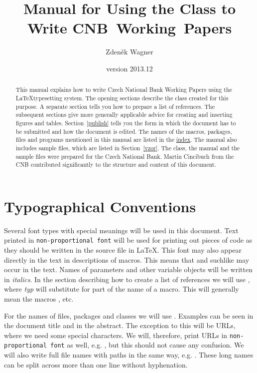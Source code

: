 \documentclass[12pt]{article}
\title{Manual for Using the \fn{cnbwp} Class to Write CNB~Working~Papers}
\author{Zdeněk Wagner}\date{version 2013.12}
\begin{document}
\maketitle

\begin{abstract}\noindent This manual explains how to write Czech National Bank Working Papers
using the  \LaTeX typesetting system. The opening sections describe the  class created
for this purpose. A separate section tells you how to prepare a list of references. The subsequent
sections give more generally applicable advice for creating and inserting figures and tables.
Section~\ref{publish} tells you the form in which the document has to be submitted and how the
document is edited. The names of the macros, packages, files and programs mentioned in this manual
are listed in the \hyperref[index]{index}. The manual also includes sample files, which are listed
in Section~\ref{vzor}. The class, the manual and the sample files were prepared for the Czech
National Bank. Martin Cincibuch from the CNB contributed significantly to the structure and content
of this document.  \end{abstract}

\tableofcontents

\section{Typographical Conventions}\label{typokon} Several font types with special meanings will be
used in this document. Text printed in \texttt{non-proportional font} will be used for printing out
pieces of code as they should be written in the source file in \LaTeX{}. This font may also appear
directly in the text in descriptions of macros. This means that  and suchlike may
occur in the text. Names of parameters and other variable objects will be written in
\textit{italics}. In the section describing how to create a list of references we will use \bibi,
where \textit{typ} will substitute for part of the name of a macro. This will generally mean the
macros ,  etc.

For the names of files, packages and classes we will use . Examples can be seen
in the document title and in the abstract. The exception to this will be URLs, where we need some
special characters. We will, therefore, print URLs in \texttt{non-proportional font} as well, e.g.
, but this should not cause any confusion. We will also
write full file names with paths in the same way, e.g.
. These long names can be split across more
than one line without hyphenation.
	
\end{document}

